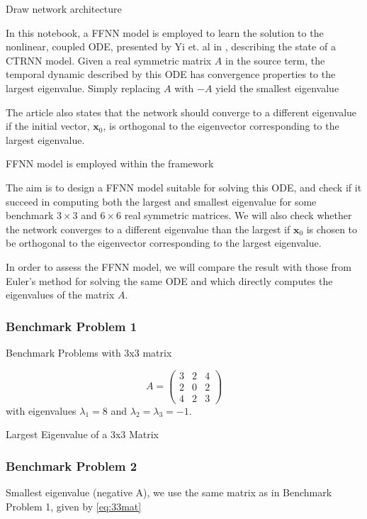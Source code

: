 Draw network architecture 

In this notebook, a FFNN model is employed to learn the solution to the nonlinear, coupled ODE, presented by Yi et. al in \cite{yfh04}, describing the state of a CTRNN model. Given a real symmetric matrix $A$ in the source term, the temporal dynamic described by this ODE has convergence properties to the largest eigenvalue. Simply replacing $A$ with $-A$ yield the smallest eigenvalue

The article also states that the network should converge to a different eigenvalue if the initial vector, $\mathbf{x}_0$, is orthogonal to the eigenvector corresponding to the largest eigenvalue.

FFNN model is employed within the  framework


The aim is to design a FFNN model suitable for solving this ODE, and check if it succeed in computing both the largest and smallest eigenvalue for some benchmark $3\times 3$ and $6\times 6$ real symmetric matrices. We will also check whether the network converges to a different eigenvalue than the largest if $\mathbf{x}_0$ is chosen to be orthogonal to the eigenvector corresponding to the largest eigenvalue. 

In order to assess the FFNN model, we will compare the result with those from Euler's method for solving the same ODE and   which directly computes the eigenvalues of the matrix $A$.

\subsubsection{Benchmark Problem 1}\label{sec:benchmark problem 1}
Benchmark Problems with 3x3 matrix

\begin{equation}\label{eq:33mat}
    A = \left(\begin{array}{ccc}
        3 & 2 & 4  \\
        2 & 0 & 2  \\
        4 & 2 & 3
    \end{array}\right)
\end{equation}
with eigenvalues $\lambda_1 = 8$ and $\lambda_2 = \lambda_3 = -1$.

Largest Eigenvalue of a 3x3 Matrix

\subsubsection{Benchmark Problem 2}\label{sec:benchmark problem 2}
Smallest eigenvalue (negative A),
we use the same matrix as in Benchmark Problem 1, given by \autoref{eq:33mat}


